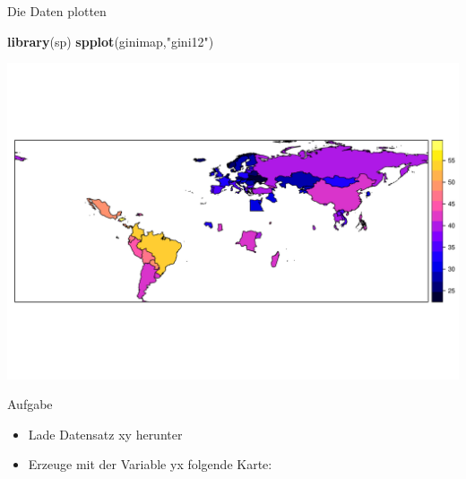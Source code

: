 \documentclass[ignorenonframetext,]{beamer}
\newenvironment{Shaded}{\begin{snugshade}}{\end{snugshade}}
\newcommand{\KeywordTok}[1]{\textcolor[rgb]{0.13,0.29,0.53}{\textbf{#1}}}
\newcommand{\NormalTok}[1]{#1}
\newcommand{\StringTok}[1]{\textcolor[rgb]{0.31,0.60,0.02}{#1}}
\providecommand{\tightlist}{%
  \setlength{\itemsep}{0pt}\setlength{\parskip}{0pt}}
\begin{document}
\begin{frame}[fragile]{Die Daten plotten}
\protect\hypertarget{die-daten-plotten}{}

\begin{Shaded}
\begin{Highlighting}[]
\KeywordTok{library}\NormalTok{(sp)}
\KeywordTok{spplot}\NormalTok{(ginimap,}\StringTok{"gini12"}\NormalTok{)}
\end{Highlighting}
\end{Shaded}

\includegraphics{Choroplethen_files/figure-beamer/unnamed-chunk-9-1.pdf}

\end{frame}

\begin{frame}{Aufgabe}
\protect\hypertarget{aufgabe}{}

\begin{itemize}
\tightlist
\item
  Lade Datensatz xy herunter
\item
  Erzeuge mit der Variable yx folgende Karte:
\end{itemize}

\end{frame}
\end{document}
